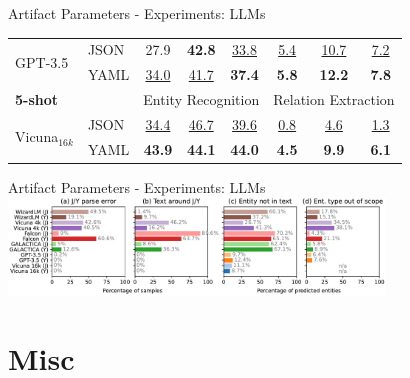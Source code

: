 \documentclass[en,16:9,smallfoot]{sdqbeamer}
\begin{document}
\begin{frame}{Artifact Parameters - Experiments: LLMs}
\begin{table}
\begin{small}
\begin{tabular}{ll|ccc|ccc}
        \multirow{2}{*}{GPT-3.5} &
        JSON & 27.9 & \textbf{42.8} & \underline{33.8}
                  & \underline{5.4} & \underline{10.7} & \underline{7.2} \\
        \ & YAML & \underline{34.0} & \underline{41.7} &
        \hphantom{${}_{\Delta\text{+3.6}}$}
        \textbf{37.4}{\color{parametergreen}{${}_{\Delta\text{+3.6}}$}}
                  & \textbf{5.8} & \textbf{12.2} &
        \hphantom{${}_{\Delta\text{+0.6}}$}
        \textbf{7.8}{\color{parametergreen}{${}_{\Delta\text{+0.6}}$}}  \\

      \hline
        \multicolumn{2}{l|}{\textbf{5-shot}} &
        \multicolumn{3}{c|}{Entity Recognition} &
        \multicolumn{3}{c}{Relation Extraction} \\
      \hline

        \multirow{2}{*}{Vicuna${}_{16k}$} &
        JSON & \underline{34.4} & \underline{46.7} & \underline{39.6}
                  & \underline{0.8} & \underline{4.6} & \underline{1.3} \\
        \ & YAML & \textbf{43.9} & \textbf{44.1} &
        \hphantom{${}_{\Delta\text{+0.4}}$}
        \textbf{44.0}{\color{parametergreen}{${}_{\Delta\text{+0.4}}$}}
                  & \textbf{4.5} & \textbf{9.9} &
        \hphantom{${}_{\Delta\text{+4.8}}$}
        \textbf{6.1}{\color{parametergreen}{${}_{\Delta\text{+4.8}}$}}  \\
      \hline
      \end{tabular}
     \end{small}
    \end{table}
   \end{frame}

   \begin{frame}{Artifact Parameters - Experiments: LLMs}
       \centering
       \includegraphics[width=0.75\textwidth]{imgs/llm_format_eval_mix}
   \end{frame}

\section{Misc}
\end{document}
